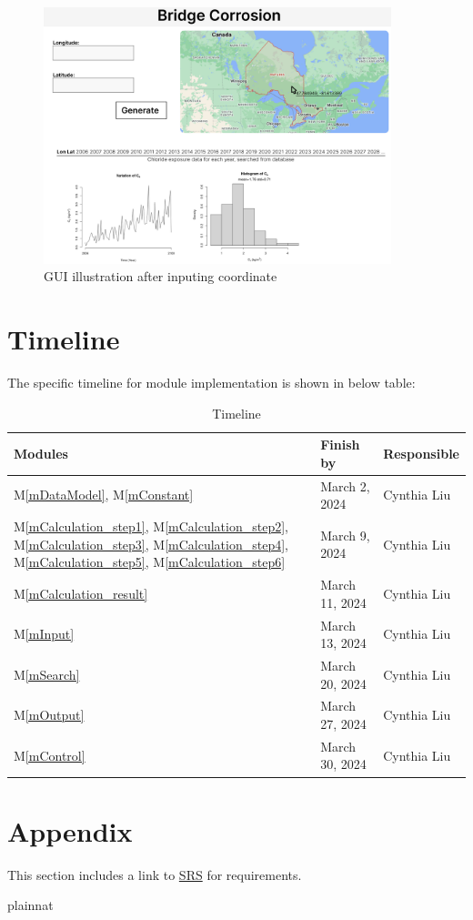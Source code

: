\documentclass[12pt, titlepage]{article}
\newcommand{\mref}[1]{M\ref{#1}}
\begin{document}
\begin{figure}[H]
\centering
\includegraphics[width=0.9\textwidth]{GUI2.png}
\caption{GUI illustration after inputing coordinate}
\label{FigGUI1}
\end{figure}

\section{Timeline}
The specific timeline for module implementation is shown in below table:
\begin{table}[H]
\centering
\begin{tabular}{p{} p{}  p{}}
\toprule
 \textbf{Modules} & \textbf{Finish by} & \textbf{Responsible} \\
\midrule
\mref{mDataModel}, \mref{mConstant} & March 2, 2024& Cynthia Liu\\
\mref{mCalculation_step1}, \mref{mCalculation_step2}, \mref{mCalculation_step3}, \mref{mCalculation_step4}, \mref{mCalculation_step5}, \mref{mCalculation_step6} & March 9, 2024& Cynthia Liu\\
\mref{mCalculation_result} & March 11, 2024& Cynthia Liu\\
\mref{mInput} & March 13, 2024 & Cynthia Liu\\
\mref{mSearch} & March 20, 2024 & Cynthia Liu\\
\mref{mOutput}  & March 27, 2024 & Cynthia Liu\\
\mref{mControl} & March 30, 2024 & Cynthia Liu\\

\bottomrule
\end{tabular}
\caption{Timeline}
\end{table}


\section{Appendix}
This section includes a link to \href{https://github.com/CynthiaLiu0805/BridgeCorrosion/blob/main/docs/SRS/SRS.pdf}{SRS} for requirements.


 {plainnat}


\newpage{}
\end{document}
